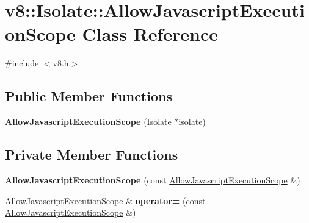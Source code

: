\hypertarget{classv8_1_1_isolate_1_1_allow_javascript_execution_scope}{}\section{v8\+:\+:Isolate\+:\+:Allow\+Javascript\+Execution\+Scope Class Reference}
\label{classv8_1_1_isolate_1_1_allow_javascript_execution_scope}


{\ttfamily \#include $<$v8.\+h$>$}

\subsection*{Public Member Functions}
\begin{DoxyCompactItemize}
\item 
{\bfseries Allow\+Javascript\+Execution\+Scope} (\hyperlink{classv8_1_1_isolate}{Isolate} $\ast$isolate)\hypertarget{classv8_1_1_isolate_1_1_allow_javascript_execution_scope_ac73a647c33756c6b7c3896170e069e8c}{}\label{classv8_1_1_isolate_1_1_allow_javascript_execution_scope_ac73a647c33756c6b7c3896170e069e8c}

\end{DoxyCompactItemize}
\subsection*{Private Member Functions}
\begin{DoxyCompactItemize}
\item 
{\bfseries Allow\+Javascript\+Execution\+Scope} (const \hyperlink{classv8_1_1_isolate_1_1_allow_javascript_execution_scope}{Allow\+Javascript\+Execution\+Scope} \&)\hypertarget{classv8_1_1_isolate_1_1_allow_javascript_execution_scope_a9968118fbefa05ce6cb97373efe32656}{}\label{classv8_1_1_isolate_1_1_allow_javascript_execution_scope_a9968118fbefa05ce6cb97373efe32656}

\item 
\hyperlink{classv8_1_1_isolate_1_1_allow_javascript_execution_scope}{Allow\+Javascript\+Execution\+Scope} \& {\bfseries operator=} (const \hyperlink{classv8_1_1_isolate_1_1_allow_javascript_execution_scope}{Allow\+Javascript\+Execution\+Scope} \&)\hypertarget{classv8_1_1_isolate_1_1_allow_javascript_execution_scope_a4ca08db8ddcb39695011739c31b54349}{}\label{classv8_1_1_isolate_1_1_allow_javascript_execution_scope_a4ca08db8ddcb39695011739c31b54349}

\end{DoxyCompactItemize}
